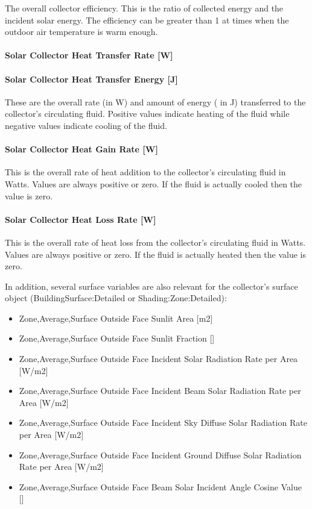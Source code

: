 The overall collector efficiency. This is the ratio of collected energy and the incident solar energy. The efficiency can be greater than 1 at times when the outdoor air temperature is warm enough.

\paragraph{Solar Collector Heat Transfer Rate {[}W{]}}\label{solar-collector-heat-transfer-rate-w}

\paragraph{Solar Collector Heat Transfer Energy {[}J{]}}\label{solar-collector-heat-transfer-energy-j}

These are the overall rate (in W) and amount of energy ( in J) transferred to the collector's circulating fluid. Positive values indicate heating of the fluid while negative values indicate cooling of the fluid.

\paragraph{Solar Collector Heat Gain Rate {[}W{]}}\label{solar-collector-heat-gain-rate-w}

This is the overall rate of heat addition to the collector's circulating fluid in Watts. Values are always positive or zero. If the fluid is actually cooled then the value is zero.

\paragraph{Solar Collector Heat Loss Rate {[}W{]}}\label{solar-collector-heat-loss-rate-w}

This is the overall rate of heat loss from the collector's circulating fluid in Watts. Values are always positive or zero. If the fluid is actually heated then the value is zero.

In addition, several surface variables are also relevant for the collector's surface object (BuildingSurface:Detailed or Shading:Zone:Detailed):

\begin{itemize}
\item
  Zone,Average,Surface Outside Face Sunlit Area {[}m2{]}
\item
  Zone,Average,Surface Outside Face Sunlit Fraction {[]}
\item
  Zone,Average,Surface Outside Face Incident Solar Radiation Rate per Area {[}W/m2{]}
\item
  Zone,Average,Surface Outside Face Incident Beam Solar Radiation Rate per Area {[}W/m2{]}
\item
  Zone,Average,Surface Outside Face Incident Sky Diffuse Solar Radiation Rate per Area {[}W/m2{]}
\item
  Zone,Average,Surface Outside Face Incident Ground Diffuse Solar Radiation Rate per Area {[}W/m2{]}
\item
  Zone,Average,Surface Outside Face Beam Solar Incident Angle Cosine Value {[]}
\end{itemize}

